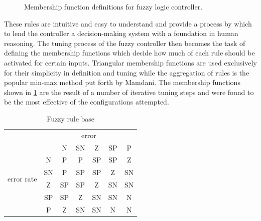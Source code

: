 \begin{figure}[ht]
\begin{subfigmatrix}{3}
    \end{subfigmatrix}
    \caption{Membership function definitions for fuzzy logic controller.}\label{f:fuzzy_mfs}
\end{figure}
These rules are intuitive and easy to understand and provide a process by which to lend the controller a
decision-making system with a foundation in human reasoning. The tuning process of the fuzzy controller then
becomes the task of defining the membership functions which decide how much of each rule should be activated
for certain inputs. Triangular membership functions are used exclusively for their simplicity in definition
and tuning\cite{mishra1994performance} while the aggregation of rules is the popular min-max method put forth
by Mamdani\cite{MAMDANI19751}. The membership functions shown in \cref{f:fuzzy_mfs} are the result of a number
of iterative tuning steps and were found to be the most effective of the configurations attempted.


\begin{table}[ht]
    \centering
    \caption{Fuzzy rule base}\label{t:rules}
    \begin{tabular}{cc||c|c|c|c|c|}
        &  \multicolumn{6}{c}{error}  \\ 	
        \multirow{6}{*}{error rate} &    & N  & SN & Z  & SP & P  \\ 	\hhline{~=#=|=|=|=|=|}
                                    & N  & P  & P  & SP & SP & Z  \\ 	\cline{2-7}
                                    & SN & P  & SP & SP & Z  & SN \\ 	\cline{2-7}
                                    & Z  & SP & SP & Z  & SN & SN \\ 	\cline{2-7}
                                    & SP & SP & Z  & SN & SN & N  \\ 	\cline{2-7}
                                    & P  & Z  & SN & SN & N  & N  \\ 	\cline{2-7}
    \end{tabular}
\end{table}

